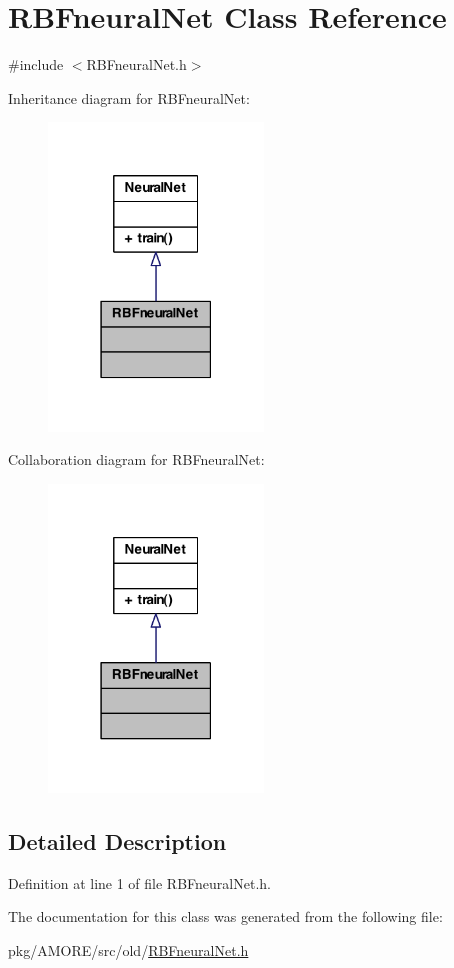 \hypertarget{class_r_b_fneural_net}{
\section{RBFneuralNet Class Reference}
\label{class_r_b_fneural_net}
}


{\ttfamily \#include $<$RBFneuralNet.h$>$}



Inheritance diagram for RBFneuralNet:
\nopagebreak
\begin{figure}[H]
\begin{center}
\leavevmode
\includegraphics[width=162pt]{class_r_b_fneural_net__inherit__graph}
\end{center}
\end{figure}


Collaboration diagram for RBFneuralNet:
\nopagebreak
\begin{figure}[H]
\begin{center}
\leavevmode
\includegraphics[width=162pt]{class_r_b_fneural_net__coll__graph}
\end{center}
\end{figure}


\subsection{Detailed Description}


Definition at line 1 of file RBFneuralNet.h.



The documentation for this class was generated from the following file:\begin{DoxyCompactItemize}
\item 
pkg/AMORE/src/old/\hyperlink{_r_b_fneural_net_8h}{RBFneuralNet.h}\end{DoxyCompactItemize}
